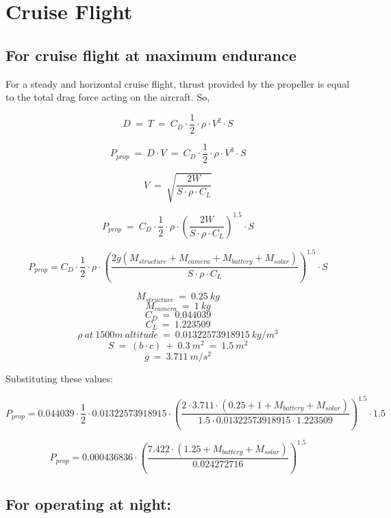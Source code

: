 \chapter{Cruise Flight}
\label{chap: Cruise Flight}

\section{For cruise flight at maximum endurance}

\p For a steady and horizontal cruise flight, thrust provided by the propeller is equal to the total drag force acting on the aircraft. So,

\[
D \ = \ T \ = \ C_D \cdot \frac{1}{2} \cdot \rho \cdot V^2 \cdot S
\]

\[
P_{prop} \ = \ D \cdot V \ = \ C_D \cdot \frac{1}{2} \cdot \rho \cdot V^3 \cdot S
\]

\[
V \ = \ \sqrt{\frac{2W}{S \cdot \rho \cdot C_L }}
\]

\[
P_{prop} \ = \  C_D \cdot \frac{1}{2} \cdot \rho \cdot \left(\frac{2W}{S \cdot \rho \cdot C_L }\right)^{1.5} \cdot S
\]



\[
P_{prop} = C_D \cdot \frac{1}{2} \cdot \rho \cdot \left(\frac{2g(M_{structure} + M_{camera} + M_{battery} + M_{solar})}{S \cdot \rho \cdot C_L} \right)^{1.5} \cdot S
\]

\[ M_{structure} \ = \ 0.25 \ kg \]
\[ M_{camera} \ = \ 1 \ kg \]
\[ C_D \ = \ 0.044039 \]
\[ C_L \ = \ 1.223509 \]
\[ \rho \ at \ 1500m \ altitude \ = \ 0.01322573918915 \ kg/m^3 \]
\[S \ = \ ( b \cdot c ) \ + \ 0.3 \ m^2 \ = \ 1.5 \ m^2\]
\[g \ = \ 3.711 \ m/s^2 \]

Substituting these values:

\[
P_{prop} = 0.044039 \cdot \frac{1}{2} \cdot 0.01322573918915 \cdot \left(\frac{2 \cdot 3.711 \cdot (0.25 + 1 + M_{battery} + M_{solar})}{1.5 \cdot 0.01322573918915 \cdot 1.223509} \right)^{1.5} \cdot 1.5
\]


\[
P_{prop} = 0.000436836 \cdot \left(\frac{7.422 \cdot (1.25 + M_{battery} + M_{solar})}{ 0.024272716 } \right)^{1.5}
\]






\section{For operating at night:}

